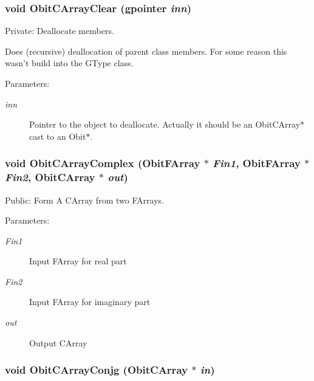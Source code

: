 \subsubsection{\setlength{\rightskip}{0pt plus 5cm}void Obit\-CArray\-Clear (gpointer {\em inn})}\label{ObitCArray_8c_a4}


Private: Deallocate members. 

Does (recursive) deallocation of parent class members. For some reason this wasn't build into the GType class. \begin{Desc}
\item[Parameters:]
\begin{description}
\item[{\em inn}]Pointer to the object to deallocate. Actually it should be an Obit\-CArray$\ast$ cast to an Obit$\ast$. \end{description}
\end{Desc}
\subsubsection{\setlength{\rightskip}{0pt plus 5cm}void Obit\-CArray\-Complex ({\bf Obit\-FArray} $\ast$ {\em Fin1}, {\bf Obit\-FArray} $\ast$ {\em Fin2}, {\bf Obit\-CArray} $\ast$ {\em out})}\label{ObitCArray_8c_a33}


Public: Form A CArray from two FArrays. 

\begin{Desc}
\item[Parameters:]
\begin{description}
\item[{\em Fin1}]Input FArray for real part \item[{\em Fin2}]Input FArray for imaginary part \item[{\em out}]Output CArray \end{description}
\end{Desc}
\subsubsection{\setlength{\rightskip}{0pt plus 5cm}void Obit\-CArray\-Conjg ({\bf Obit\-CArray} $\ast$ {\em in})}\label{ObitCArray_8c_a16}


